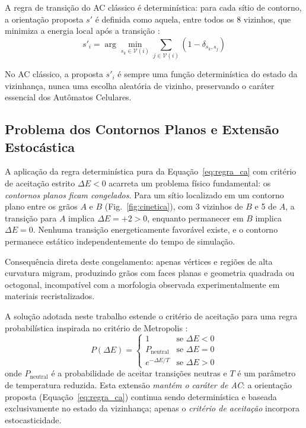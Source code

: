 \documentclass[12pt,a4paper]{article}
\begin{document}
A regra de transição do AC clássico é determinística: para cada sítio de contorno,
a orientação proposta $s'$ é definida como aquela, entre todos os 8 vizinhos, que
minimiza a energia local após a transição \cite{he2006}:
\begin{equation}
    s'_i = \arg\min_{s_k \in \mathcal{V}(i)} \sum_{j \in \mathcal{V}(i)} (1 - \delta_{s_k, s_j})
    \label{eq:regra_ca}
\end{equation}

No AC clássico, a proposta $s'_i$ é sempre uma função determinística do estado da
vizinhança, nunca uma escolha aleatória de vizinho, preservando o caráter essencial
dos Autômatos Celulares.

\subsection{Problema dos Contornos Planos e Extensão Estocástica}
\label{sec:prob_congelados}

A aplicação da regra determinística pura da Equação~\ref{eq:regra_ca} com critério
de aceitação estrito $\Delta E < 0$ acarreta um problema físico fundamental: os
\emph{contornos planos ficam congelados}. Para um sítio localizado em um contorno
plano entre os grãos $A$ e $B$ (Fig.~\ref{fig:cinetica}), com 3 vizinhos de $B$ e
5 de $A$, a transição para $A$ implica $\Delta E = +2 > 0$, enquanto permanecer
em $B$ implica $\Delta E = 0$. Nenhuma transição energeticamente favorável existe,
e o contorno permanece estático independentemente do tempo de simulação.

Consequência direta deste congelamento: apenas vértices e regiões de alta curvatura
migram, produzindo grãos com faces planas e geometria quadrada ou octogonal,
incompatível com a morfologia observada experimentalmente em materiais recristalizados.

A solução adotada neste trabalho estende o critério de aceitação para uma regra
probabilística inspirada no critério de Metropolis \cite{rollett2004}:
\begin{equation}
    P(\Delta E) =
    \begin{cases}
        1                       & \text{se } \Delta E < 0 \\
        P_{\text{neutral}}      & \text{se } \Delta E = 0 \\
        e^{-\Delta E / T}       & \text{se } \Delta E > 0
    \end{cases}
    \label{eq:aceitacao}
\end{equation}
onde $P_{\text{neutral}}$ é a probabilidade de aceitar transições neutras e $T$ é um
parâmetro de temperatura reduzida. Esta extensão \emph{mantém o caráter de AC}: a
orientação proposta (Equação~\ref{eq:regra_ca}) continua sendo determinística e
baseada exclusivamente no estado da vizinhança; apenas o \emph{critério de aceitação}
incorpora estocasticidade.
\end{document}
